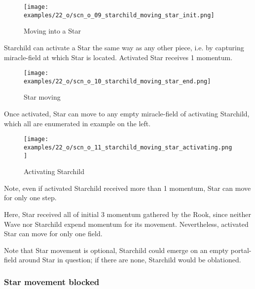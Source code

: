 \noindent
\begin{wrapfigure}[5]{l}{0.4\textwidth}
\centering
\texttt{[image: examples/22\_o/scn\_o\_09\_starchild\_moving\_star\_init.png]}
\caption{Moving into a Star}
\label{fig:scn_o_09_starchild_moving_star_init}
\end{wrapfigure}
Starchild can activate a Star the same way as any other piece, i.e. by capturing
miracle-field at which Star is located. Activated Star receives 1 momentum.

\vspace*{2.1\baselineskip}
\noindent
\begin{wrapfigure}[4]{l}{0.4\textwidth}
\centering
\texttt{[image: examples/22\_o/scn\_o\_10\_starchild\_moving\_star\_end.png]}
\caption{Star moving}
\label{fig:scn_o_10_starchild_moving_star_end}
\end{wrapfigure}
Once activated, Star can move to any empty miracle-field of activating Starchild,
which all are enumerated in example on the left.

\vspace*{2.3\baselineskip}
\noindent
\begin{wrapfigure}[8]{l}{0.4\textwidth}
\centering
\texttt{[image: examples/22\_o/scn\_o\_11\_starchild\_moving\_star\_activating.png]}
\caption{Activating Starchild}
\label{fig:scn_o_11_starchild_moving_star_activating}
\end{wrapfigure}
Note, even if activated Starchild received more than 1 momentum, Star can move for
only one step.

Here, Star received all of initial 3 momentum gathered by the Rook, since neither
Wave nor Starchild expend momentum for its movement. Nevertheless, activated Star
can move for only one field.

Note that Star movement is optional, Starchild could emerge on an empty portal-field
around Star in question; if there are none, Starchild would be oblationed.

\clearpage %

\subsubsection*{Star movement blocked}
\label{sec:One/Starchild/Movement/Star movement blocked}


